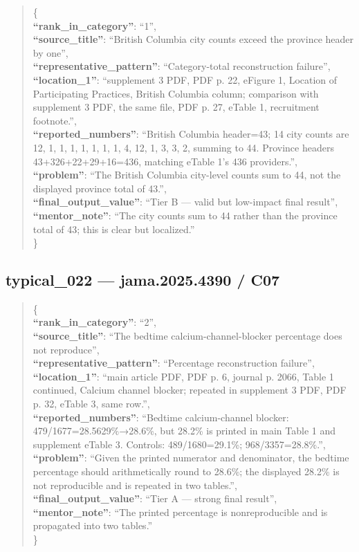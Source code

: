 \documentclass[
  letterpaper,
  9pt]{extreport}
\begin{document}
\begin{quote}
\{\\
\textbf{``rank\_in\_category''}: ``1'',\\
\textbf{``source\_title''}: ``British Columbia city counts exceed the
province header by one'',\\
\textbf{``representative\_pattern''}: ``Category-total reconstruction
failure'',\\
\textbf{``location\_1''}: ``supplement 3 PDF, PDF p. 22, eFigure 1,
Location of Participating Practices, British Columbia column; comparison
with supplement 3 PDF, the same file, PDF p. 27, eTable 1, recruitment
footnote.'',\\
\textbf{``reported\_numbers''}: ``British Columbia header=43; 14 city
counts are 12, 1, 1, 1, 1, 1, 1, 1, 4, 12, 1, 3, 3, 2, summing to 44.
Province headers 43+326+22+29+16=436, matching eTable 1's 436
providers.'',\\
\textbf{``problem''}: ``The British Columbia city-level counts sum to
44, not the displayed province total of 43.'',\\
\textbf{``final\_output\_value''}: ``Tier B --- valid but low-impact
final result'',\\
\textbf{``mentor\_note''}: ``The city counts sum to 44 rather than the
province total of 43; this is clear but localized.''\\
\}
\end{quote}

\hypertarget{typical_022--jama20254390--c07}{%
\subsection{typical\_022 --- jama.2025.4390 /
C07}\label{typical_022--jama20254390--c07}}

\begin{quote}
\{\\
\textbf{``rank\_in\_category''}: ``2'',\\
\textbf{``source\_title''}: ``The bedtime calcium-channel-blocker
percentage does not reproduce'',\\
\textbf{``representative\_pattern''}: ``Percentage reconstruction
failure'',\\
\textbf{``location\_1''}: ``main article PDF, PDF p. 6, journal p. 2066,
Table 1 continued, Calcium channel blocker; repeated in supplement 3
PDF, PDF p. 32, eTable 3, same row.'',\\
\textbf{``reported\_numbers''}: ``Bedtime calcium-channel blocker:
479/1677=28.5629\%→28.6\%, but 28.2\% is printed in main Table 1 and
supplement eTable 3. Controls: 489/1680=29.1\%; 968/3357=28.8\%.'',\\
\textbf{``problem''}: ``Given the printed numerator and denominator, the
bedtime percentage should arithmetically round to 28.6\%; the displayed
28.2\% is not reproducible and is repeated in two tables.'',\\
\textbf{``final\_output\_value''}: ``Tier A --- strong final result'',\\
\textbf{``mentor\_note''}: ``The printed percentage is nonreproducible
and is propagated into two tables.''\\
\}
\end{quote}
\end{document}
